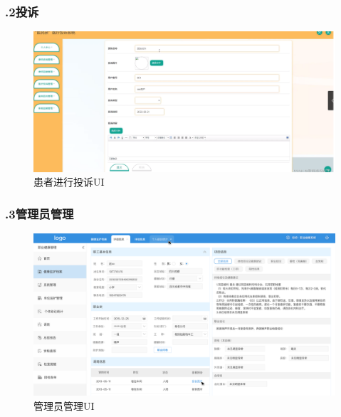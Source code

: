 \documentclass[24pt,a4paper]{article}%
\begin{document}
\subsubsection*{.2投诉}
\begin{figure}[H]
	\centering
	\includegraphics[width=1\textwidth]{./image/complaint-1.png}
	\caption*{患者进行投诉UI}
\end{figure}

\subsubsection*{.3管理员管理}
\begin{figure}[H]
	\centering
	\includegraphics[width=1\textwidth]{./image/admin-1.png}
	\caption*{管理员管理UI}
\end{figure}
\end{document}
